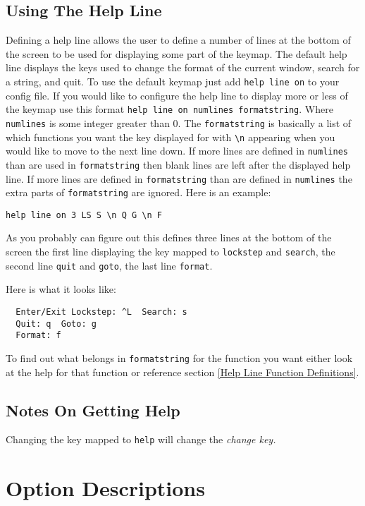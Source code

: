 \documentclass[12pt]{article}
\begin{document}
\subsection{Using The Help Line}
\label{Using The Help Line}
Defining a help line allows the user to define a number of lines at the bottom
of the screen to be used for displaying some part of the keymap.  The default
help line displays the keys used to change the format of the current window, 
search for a string, and quit.  To use the default keymap just add \verb#help line on# to your config file.  If you would like to configure the help line to
display more or less of the keymap use this format \verb#help line on numlines formatstring#.  Where \verb#numlines# is some integer greater than 0.  The \verb#formatstring# is basically a list of which functions you want the key displayed for with \verb#\n# appearing when you would like to move to the next line down. If more lines are defined in \verb#numlines# than are used in 
\verb#formatstring# then blank lines are left after the displayed help line.  
If more lines are defined in \verb#formatstring# than are defined in 
\verb#numlines# the extra parts of \verb#formatstring# are ignored. Here is an
example:
\begin{verbatim}
help line on 3 LS S \n Q G \n F
\end{verbatim}
As you probably can figure out this defines three lines at the bottom of the
screen the first line displaying the key mapped to \verb#lockstep# and 
\verb#search#, the second line \verb#quit# and \verb#goto#, the last line 
\verb#format#.

Here is what it looks like:
\begin{verbatim}
  Enter/Exit Lockstep: ^L  Search: s
  Quit: q  Goto: g
  Format: f
\end{verbatim}

To find out what belongs in \verb#formatstring# for the function you want either
look at the help for that function or reference section \ref{Help Line Function Definitions}.

\subsection{Notes On Getting Help}
\begin{list}{-}{}
\item Changing the key mapped to \verb#help# will change the \it{}change 
key\rm{}.
\end{list}


\section{Option Descriptions}
\label{Options}
\end{document}
